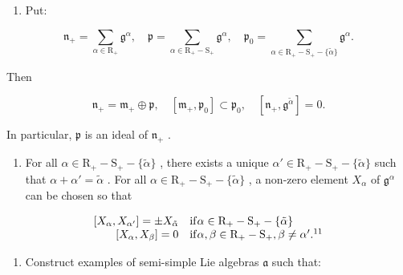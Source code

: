 \begin{enumerate}
\def\labelenumi{\alph{enumi})}
\setcounter{enumi}{1}
\tightlist
\item
  Put:
\end{enumerate}

\[
\mathfrak {n} _ {+} = \sum_ {\alpha \in \mathrm{R} _ {+}} \mathfrak {g} ^ {\alpha}, \quad \mathfrak {p} = \sum_ {\alpha \in \mathrm{R} _ {+} - \mathrm{S} _ {+}} \mathfrak {g} ^ {\alpha}, \quad \mathfrak {p} _ {0} = \sum_ {\alpha \in \mathrm{R} _ {+} - \mathrm{S} _ {+} - \{\tilde {\alpha} \}} \mathfrak {g} ^ {\alpha}.
\]

Then

\[
\mathfrak {n} _ {+} = \mathfrak {m} _ {+} \oplus \mathfrak {p}, \quad [ \mathfrak {m} _ {+}, \mathfrak {p} _ {0} ] \subset \mathfrak {p} _ {0}, \quad [ \mathfrak {n} _ {+}, \mathfrak {g} ^ {\tilde {\alpha}} ] = 0.
\]

In particular, \(\mathfrak{p}\) is an ideal of \(\mathfrak{n}_{+}\) .

\begin{enumerate}
\def\labelenumi{\alph{enumi})}
\setcounter{enumi}{2}
\tightlist
\item
  For all \(\alpha \in \mathrm{R}_{+} - \mathrm{S}_{+} - \{\tilde{\alpha}\}\) , there exists a unique \(\alpha' \in \mathrm{R}_{+} - \mathrm{S}_{+} - \{\tilde{\alpha}\}\) such that \(\alpha + \alpha' = \tilde{\alpha}\) . For all \(\alpha \in \mathrm{R}_{+} - \mathrm{S}_{+} - \{\tilde{\alpha}\}\) , a non-zero element \(X_{\alpha}\) of \(\mathfrak{g}^{\alpha}\) can be chosen so that
\end{enumerate}

\[
\begin{array}{r l} {[ X _ {\alpha}, X _ {\alpha^ {\prime}} ] = \pm X _ {\tilde {\alpha}}} & {\mathrm{if} \alpha \in \mathrm{R} _ {+} - \mathrm{S} _ {+} - \{\tilde {\alpha} \}} \\ {[ X _ {\alpha}, X _ {\beta} ] = 0} & {\mathrm{if} \alpha , \beta \in \mathrm{R} _ {+} - \mathrm{S} _ {+}, \beta \neq \alpha^ {\prime}. ^ {1 1}} \end{array}
\]


\begin{enumerate}
\def\labelenumi{\arabic{enumi})}
\setcounter{enumi}{8}
\tightlist
\item
  Construct examples of semi-simple Lie algebras \(\mathfrak{a}\) such that:
\end{enumerate}

